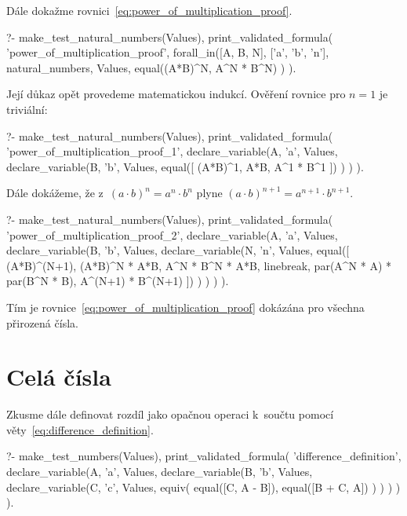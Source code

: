 Dále dokažme rovnici~\eqref{eq:power_of_multiplication_proof}.

\begin{fact}
\begin{prolog}
?-	make_test_natural_numbers(Values),
	print_validated_formula(
		'power_of_multiplication_proof',
		forall_in([A, B, N], ['a', 'b', 'n'], natural_numbers, Values,
			equal((A*B)^N, A^N * B^N)
		)
	).
\end{prolog}
\end{fact}

Její důkaz opět provedeme matematickou indukcí. Ověření rovnice pro \(n = 1\) je triviální:

\begin{prolog}
?-	make_test_natural_numbers(Values),
	print_validated_formula(
		'power_of_multiplication_proof_1',
		declare_variable(A, 'a', Values,
			declare_variable(B, 'b', Values,
				equal([
					(A*B)^1,
					A*B,
					A^1 * B^1
				])
			)
		)
	).
\end{prolog}

Dále dokážeme, že z~\((a \cdot b)^n = a^n \cdot b^n\) plyne \((a \cdot b)^{n+1} = a^{n+1} \cdot b^{n+1}\).

\begin{prolog}
?-	make_test_natural_numbers(Values),
	print_validated_formula(
		'power_of_multiplication_proof_2',
		declare_variable(A, 'a', Values,
			declare_variable(B, 'b', Values,
				declare_variable(N, 'n', Values,
					equal([
						(A*B)^(N+1),
						(A*B)^N * A*B,
						A^N * B^N * A*B,
						linebreak,
						par(A^N * A) * par(B^N * B),
						A^(N+1) * B^(N+1)
					])
				)
			)
		)
	).
\end{prolog}

Tím je rovnice~\eqref{eq:power_of_multiplication_proof} dokázána pro všechna přirozená čísla.

\section{Celá čísla}

Zkusme dále definovat rozdíl jako opačnou operaci k~součtu pomocí věty~\eqref{eq:difference_definition}.

\begin{prolog}
?-	make_test_numbers(Values),
	print_validated_formula(
		'difference_definition',
		declare_variable(A, 'a', Values,
			declare_variable(B, 'b', Values,
				declare_variable(C, 'c', Values,
					equiv(
						equal([C, A - B]),
						equal([B + C, A])
					)
				)
			)
		)
	).
\end{prolog}

